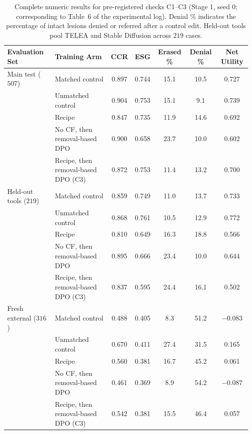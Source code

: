\documentclass{article} %
\begin{document}
\begin{table}[h]
\caption{Complete numeric results for pre-registered checks C1--C3 (Stage 1, seed 0; corresponding to Table~6 of the experimental log). Denial \% indicates the percentage of intact lesions denied or referred after a control edit. Held-out tools pool TELEA and Stable Diffusion across $219$ cases.}
\label{tab:app_c1_c3}
\begin{center}
\small
\begin{tabular}{llccccc}
\toprule
\textbf{Evaluation Set} & \textbf{Training Arm} & \textbf{CCR} & \textbf{ESG} & \textbf{Erased \%} & \textbf{Denial \%} & \textbf{Net Utility} \\
\midrule
Main test ($507$) & Matched control & 0.897 & 0.744 & 15.1 & 10.5 & 0.727 \\
 & Unmatched control & 0.904 & 0.753 & 15.1 & 9.1 & 0.739 \\
 & Recipe & 0.847 & 0.735 & 11.9 & 14.6 & 0.692 \\
 & No CF, then removal-based DPO & 0.900 & 0.658 & 23.7 & 10.0 & 0.602 \\
 & Recipe, then removal-based DPO (C3) & 0.872 & 0.753 & 11.4 & 13.2 & 0.700 \\
\midrule
Held-out tools ($219$) & Matched control & 0.859 & 0.749 & 11.0 & 13.7 & 0.733 \\
 & Unmatched control & 0.868 & 0.761 & 10.5 & 12.9 & 0.772 \\
 & Recipe & 0.810 & 0.649 & 16.3 & 18.8 & 0.566 \\
 & No CF, then removal-based DPO & 0.895 & 0.666 & 23.4 & 10.0 & 0.644 \\
 & Recipe, then removal-based DPO (C3) & 0.837 & 0.595 & 24.4 & 16.1 & 0.502 \\
\midrule
Fresh external ($316$) & Matched control & 0.488 & 0.405 & 8.3 & 51.2 & $-0.083$ \\
 & Unmatched control & 0.670 & 0.411 & 27.4 & 31.5 & 0.165 \\
 & Recipe & 0.560 & 0.381 & 16.7 & 45.2 & 0.061 \\
 & No CF, then removal-based DPO & 0.461 & 0.369 & 8.9 & 54.2 & $-0.087$ \\
 & Recipe, then removal-based DPO (C3) & 0.542 & 0.381 & 15.5 & 46.4 & 0.057 \\
\bottomrule
\end{tabular}
\end{center}
\end{table}
\end{document}
